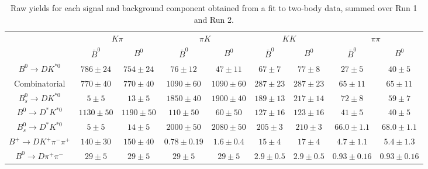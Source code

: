 \begin{table}
  \centering
  \begin{tabular}{ccccccccc}
      \toprule
       & \multicolumn{2}{c}{$K\pi$} & \multicolumn{2}{c}{$\pi K$} & \multicolumn{2}{c}{$KK$} & \multicolumn{2}{c}{$\pi\pi$} \\
      & $\bar{B}^0$ & $B^0$& $\bar{B}^0$ & $B^0$& $\bar{B}^0$ & $B^0$& $\bar{B}^0$ & $B^0$ \\
      \midrule
      $B^0 \to DK^{*0}$ & $786 \pm 24$ & $754 \pm 24$ & $76 \pm 12$ & $47 \pm 11$ & $67 \pm 7$ & $77 \pm 8$ & $27 \pm 5$ & $40 \pm 5$ \\
      Combinatorial & $770 \pm 40$ & $770 \pm 40$ & $1090 \pm 60$ & $1090 \pm 60$ & $287 \pm 23$ & $287 \pm 23$ & $65 \pm 11$ & $65 \pm 11$ \\
      $B^0_s \to DK^{*0}$ & $5 \pm 5$ & $13 \pm 5$ & $1850 \pm 40$ & $1900 \pm 40$ & $189 \pm 13$ & $217 \pm 14$ & $72 \pm 8$ & $59 \pm 7$ \\
      $B^0 \to D^*K^{*0}$ & $1130 \pm 50$ & $1190 \pm 50$ & $110 \pm 50$ & $60 \pm 50$ & $127 \pm 16$ & $123 \pm 16$ & $41 \pm 5$ & $40 \pm 5$ \\
      $B^0_s \to D^*K^{*0}$ & $5 \pm 5$ & $14 \pm 5$ & $2000 \pm 50$ & $2080 \pm 50$ & $205 \pm 3$ & $210 \pm 3$ & $66.0 \pm 1.1$ & $68.0 \pm 1.1$ \\
      $B^+ \to DK^+\pi^-\pi^+$ & $140 \pm 30$ & $150 \pm 40$ & $0.78 \pm 0.19$ & $1.6 \pm 0.4$ & $15 \pm 4$ & $17 \pm 4$ & $4.7 \pm 1.1$ & $5.4 \pm 1.3$ \\
      $B^0 \to D\pi^+\pi^-$ & $29 \pm 5$ & $29 \pm 5$ & $29 \pm 5$ & $29 \pm 5$ & $2.9 \pm 0.5$ & $2.9 \pm 0.5$ & $0.93 \pm 0.16$ & $0.93 \pm 0.16$ \\
      \bottomrule
      \end{tabular}
  \caption{Raw yields for each signal and background component obtained from a fit to two-body data, summed over Run 1 and Run 2.}
\label{tab:yields_split_2body}
\end{table}
